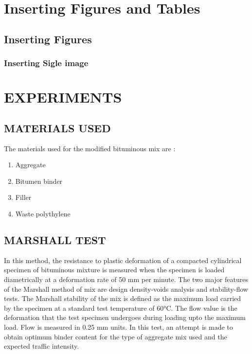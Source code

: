 \chapter{Inserting Figures and Tables}
\section{Inserting Figures}
\subsection{Inserting Sigle image}

\chapter{EXPERIMENTS}
\vspace{.5cm}
\section{MATERIALS USED}
The materials used for the modified bituminous mix are :
\begin{enumerate}
\item Aggregate
\item Bitumen binder
\item Filler
\item Waste polythylene
\end{enumerate}



\section{MARSHALL TEST}
\vspace{.5cm}
In this method, the resistance to plastic deformation of a compacted cylindrical specimen of bituminous mixture is measured when the specimen is loaded diametrically at a deformation rate of 50 mm per minute. The two major features of the Marshall method of mix are design density-voids analysis and stability-flow tests. The Marshall stability of the mix is defined as the maximum load carried by the specimen at a standard test temperature of 60°C. The flow value is the deformation that the test specimen undergoes during loading upto the maximum load. Flow is measured in 0.25 mm units. In this test, an attempt is made to obtain optimum binder content for the type of aggregate mix used and the expected traffic intensity.

